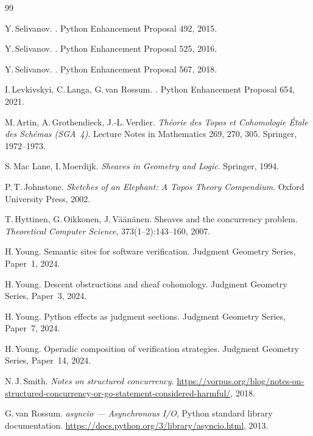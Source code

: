 \documentclass[11pt]{article}
\begin{document}

\begin{thebibliography}{99}

Y.\,Selivanov.
.
\newblock Python Enhancement Proposal 492, 2015.

Y.\,Selivanov.
.
\newblock Python Enhancement Proposal 525, 2016.

Y.\,Selivanov.
.
\newblock Python Enhancement Proposal 567, 2018.

I.\,Levkivskyi, C.\,Langa, G.\,van Rossum.
.
\newblock Python Enhancement Proposal 654, 2021.

M.\,Artin, A.\,Grothendieck, J.-L.\,Verdier.
\newblock \textit{Th\'{e}orie des Topos et Cohomologie \'{E}tale des
  Sch\'{e}mas (SGA~4)}.
\newblock Lecture Notes in Mathematics 269, 270, 305.
\newblock Springer, 1972--1973.

S.\,Mac Lane, I.\,Moerdijk.
\newblock \textit{Sheaves in Geometry and Logic}.
\newblock Springer, 1994.

P.\,T.\,Johnstone.
\newblock \textit{Sketches of an Elephant: A Topos Theory Compendium}.
\newblock Oxford University Press, 2002.

T.\,Hyttinen, G.\,Oikkonen, J.\,V\"{a}\"{a}n\"{a}nen.
\newblock Sheaves and the concurrency problem.
\newblock \textit{Theoretical Computer Science}, 373(1--2):143--160, 2007.

H.\,Young.
\newblock Semantic sites for software verification.
\newblock Judgment Geometry Series, Paper~1, 2024.

H.\,Young.
\newblock Descent obstructions and sheaf cohomology.
\newblock Judgment Geometry Series, Paper~3, 2024.

H.\,Young.
\newblock Python effects as judgment sections.
\newblock Judgment Geometry Series, Paper~7, 2024.

H.\,Young.
\newblock Operadic composition of verification strategies.
\newblock Judgment Geometry Series, Paper~14, 2024.

N.\,J.\,Smith.
\newblock \textit{Notes on structured concurrency}.
\newblock \url{https://vorpus.org/blog/notes-on-structured-concurrency-or-go-statement-considered-harmful/}, 2018.

G.\,van Rossum.
\newblock \textit{asyncio --- Asynchronous I/O}, Python standard library
  documentation.
\newblock \url{https://docs.python.org/3/library/asyncio.html}, 2013.

\end{thebibliography}
\end{document}
